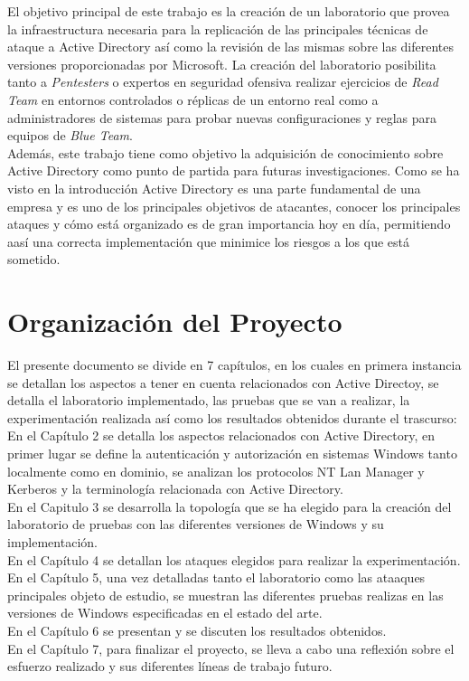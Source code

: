 El objetivo principal de este trabajo es la creación de un laboratorio que provea la infraestructura necesaria para la replicación de las principales técnicas de ataque a Active Directory así como la revisión de las mismas sobre las diferentes versiones proporcionadas por Microsoft. La creación del laboratorio posibilita tanto a {\it Pentesters} o expertos en seguridad ofensiva realizar ejercicios de {\it Read Team} en entornos controlados o réplicas de un entorno real como a administradores de sistemas para probar nuevas configuraciones y reglas para equipos de {\it Blue Team}.\\

Además, este trabajo tiene como objetivo la adquisición de conocimiento sobre Active Directory como punto de partida para futuras investigaciones. Como se ha visto en la introducción Active Directory es una parte fundamental de una empresa y es uno de los principales objetivos de atacantes, conocer los principales ataques y cómo está organizado es de gran importancia hoy en día, permitiendo aasí una correcta implementación que minimice los riesgos a los que está sometido.\\


\section{Organización del Proyecto}

El presente documento se divide en 7 capítulos, en los cuales en primera instancia se detallan los aspectos a tener en cuenta relacionados con Active Directoy, se detalla el laboratorio implementado, las pruebas que se van a realizar, la experimentación realizada así como los resultados obtenidos durante el trascurso:\\

En el Capítulo 2 se detalla los aspectos relacionados con Active Directory, en primer lugar se define la autenticación y autorización en sistemas Windows tanto localmente como en dominio, se analizan los protocolos NT Lan Manager y Kerberos y la terminología relacionada con Active Directory.\\

En el Capitulo 3 se desarrolla la topología que se ha elegido para la creación del laboratorio de pruebas con las diferentes versiones de Windows y su implementación.\\

En el Capítulo 4 se detallan los ataques elegidos para realizar la experimentación.\\

En el Capítulo 5, una vez detalladas tanto el laboratorio como las ataaques principales objeto de estudio, se muestran las diferentes pruebas realizas en las versiones de Windows especificadas en el estado del arte.\\

En el Capítulo 6 se presentan y se discuten los resultados obtenidos.\\

En el Capítulo 7, para finalizar el proyecto, se lleva a cabo una reflexión sobre el esfuerzo realizado y sus diferentes líneas de trabajo futuro. \\
